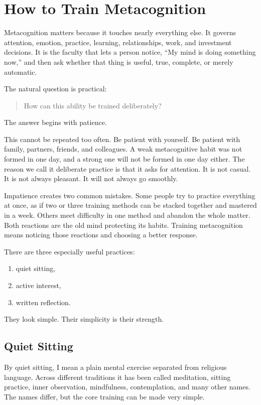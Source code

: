\chapter{How to Train Metacognition}

Metacognition matters because it touches nearly everything else. It governs attention, emotion, practice, learning, relationships, work, and investment decisions. It is the faculty that lets a person notice, ``My mind is doing something now,'' and then ask whether that thing is useful, true, complete, or merely automatic.

The natural question is practical:

\begin{quote}
How can this ability be trained deliberately?
\end{quote}

The answer begins with patience.

This cannot be repeated too often. Be patient with yourself. Be patient with family, partners, friends, and colleagues. A weak metacognitive habit was not formed in one day, and a strong one will not be formed in one day either. The reason we call it deliberate practice is that it asks for attention. It is not casual. It is not always pleasant. It will not always go smoothly.

Impatience creates two common mistakes. Some people try to practice everything at once, as if two or three training methods can be stacked together and mastered in a week. Others meet difficulty in one method and abandon the whole matter. Both reactions are the old mind protecting its habits. Training metacognition means noticing those reactions and choosing a better response.

There are three especially useful practices:

\begin{enumerate}
\item quiet sitting,
\item active interest,
\item written reflection.
\end{enumerate}

They look simple. Their simplicity is their strength.

\section*{Quiet Sitting}

By quiet sitting, I mean a plain mental exercise separated from religious language. Across different traditions it has been called meditation, sitting practice, inner observation, mindfulness, contemplation, and many other names. The names differ, but the core training can be made very simple.

